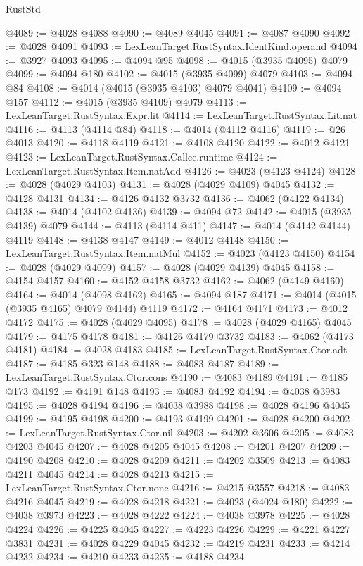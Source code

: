 \begin{lexlean}{RustStd}
\begin{coremodule}
@4089 := @4028 @4088
@4090 := @4089 @4045
@4091 := @4087 @4090
@4092 := @4028 @4091
@4093 := LexLeanTarget.RustSyntax.IdentKind.operand
@4094 := @3927 @4093
@4095 := @4094 @95
@4098 := @4015 (@3935 @4095) @4079
@4099 := @4094 @180
@4102 := @4015 (@3935 @4099) @4079
@4103 := @4094 @84
@4108 := @4014 (@4015 (@3935 @4103) @4079 @4041)
@4109 := @4094 @157
@4112 := @4015 (@3935 @4109) @4079
@4113 := LexLeanTarget.RustSyntax.Expr.lit
@4114 := LexLeanTarget.RustSyntax.Lit.nat
@4116 := @4113 (@4114 @84)
@4118 := @4014 (@4112 @4116)
@4119 := @26 @4013
@4120 := @4118 @4119
@4121 := @4108 @4120
@4122 := @4012 @4121
@4123 := LexLeanTarget.RustSyntax.Callee.runtime
@4124 := LexLeanTarget.RustSyntax.Item.natAdd
@4126 := @4023 (@4123 @4124)
@4128 := @4028 (@4029 @4103)
@4131 := @4028 (@4029 @4109) @4045
@4132 := @4128 @4131
@4134 := @4126 @4132 @3732
@4136 := @4062 (@4122 @4134)
@4138 := @4014 (@4102 @4136)
@4139 := @4094 @72
@4142 := @4015 (@3935 @4139) @4079
@4144 := @4113 (@4114 @411)
@4147 := @4014 (@4142 @4144) @4119
@4148 := @4138 @4147
@4149 := @4012 @4148
@4150 := LexLeanTarget.RustSyntax.Item.natMul
@4152 := @4023 (@4123 @4150)
@4154 := @4028 (@4029 @4099)
@4157 := @4028 (@4029 @4139) @4045
@4158 := @4154 @4157
@4160 := @4152 @4158 @3732
@4162 := @4062 (@4149 @4160)
@4164 := @4014 (@4098 @4162)
@4165 := @4094 @187
@4171 := @4014 (@4015 (@3935 @4165) @4079 @4144) @4119
@4172 := @4164 @4171
@4173 := @4012 @4172
@4175 := @4028 (@4029 @4095)
@4178 := @4028 (@4029 @4165) @4045
@4179 := @4175 @4178
@4181 := @4126 @4179 @3732
@4183 := @4062 (@4173 @4181)
@4184 := @4028 @4183
@4185 := LexLeanTarget.RustSyntax.Ctor.adt
@4187 := @4185 @323 @148
@4188 := @4083 @4187
@4189 := LexLeanTarget.RustSyntax.Ctor.cons
@4190 := @4083 @4189
@4191 := @4185 @173
@4192 := @4191 @148
@4193 := @4083 @4192
@4194 := @4038 @3983
@4195 := @4028 @4194
@4196 := @4038 @3988
@4198 := @4028 @4196 @4045
@4199 := @4195 @4198
@4200 := @4193 @4199
@4201 := @4028 @4200
@4202 := LexLeanTarget.RustSyntax.Ctor.nil
@4203 := @4202 @3606
@4205 := @4083 @4203 @4045
@4207 := @4028 @4205 @4045
@4208 := @4201 @4207
@4209 := @4190 @4208
@4210 := @4028 @4209
@4211 := @4202 @3509
@4213 := @4083 @4211 @4045
@4214 := @4028 @4213
@4215 := LexLeanTarget.RustSyntax.Ctor.none
@4216 := @4215 @3557
@4218 := @4083 @4216 @4045
@4219 := @4028 @4218
@4221 := @4023 (@4024 @180)
@4222 := @4038 @3973
@4223 := @4028 @4222
@4224 := @4038 @3978
@4225 := @4028 @4224
@4226 := @4225 @4045
@4227 := @4223 @4226
@4229 := @4221 @4227 @3831
@4231 := @4028 @4229 @4045
@4232 := @4219 @4231
@4233 := @4214 @4232
@4234 := @4210 @4233
@4235 := @4188 @4234

\end{coremodule}
\end{lexlean}
